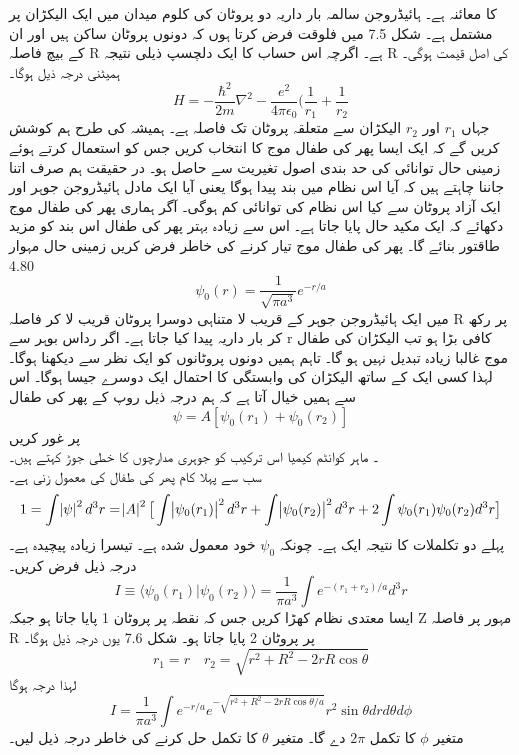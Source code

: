 \documentclass{book}
\begin{document}
 کا معائنہ ہے۔ ہائیڈروجن سالمہ بار داریہ دو پروٹان کی کلوم میدان میں ایک الیکڑان پر مشتمل ہے۔  شکل 7.5 
میں فلوقت فرض کرتا ہوں کہ دونوں پروٹان ساکن ہیں اور ان کے بیچ فاصلہ R  ہے۔ اگرچہ اس حساب کا ایک دلچسپ ذیلی نتیجہ R کی اصل قیمت ہوگی۔  ہمیٹنی درجہ ذیل ہوگا۔
 \[H=-\frac{\hbar^{2}}{2m}\nabla^{2}-\frac{e^{2}}{4\pi\epsilon_{0}}(\frac{1}{r_{1}}+\frac{1}{r_{2}}\]
جہاں
\( r_{1}\)  
اور 
\(r_{2}\) 
الیکڑان سے متعلقہ پروٹان تک فاصلہ ہے۔ ہمیشہ کی طرح ہم کوشش کریں گے کہ ایک ایسا پھر کی طفال موج کا انتخاب کریں جس کو استعمال کرتے ہوئے زمینی حال توانائی کی حد بندی اصول تغیریت سے حاصل ہو۔ در حقیقت ہم صرف اتنا جاننا چاہتے ہیں کہ آیا اس نظام میں  بند پیدا ہوگا یعنی آیا ایک مادل ہائیڈروجن جوہر اور ایک آزاد پروٹان سے کیا اس نظام کی توانائی کم ہوگی۔ آگر ہماری پھر کی طفال موج دکھائے کہ ایک مکید حال پایا جاتا ہے۔ اس سے زیادہ بہتر پھر کی طفال اس بند کو مزید طاقتور بنائے گا۔ پھر کی طفال موج تیار کرنے کی خاطر فرض کریں زمینی حال مہوار 4.80
\[\psi_{0}(r)=\frac{1}{\sqrt{\pi a^{3}}}e^{-r/a}\]
 میں ایک ہائیڈروجن جوہر کے قریب لا متناہی دوسرا پروٹان قریب لا کر فاصلہ  R پر رکھ کر بار داریہ پیدا کیا جاتا ہے۔ اگر رداس بوہر سے r کافی بڑا ہو تب الیکڑان کی طفال موج غالبا زیادہ تبدیل نہیں ہو گا۔ تاہم ہمیں دونوں پروٹانوں کو ایک نظر سے دیکھنا ہوگا۔ لہذا کسی ایک کے ساتھ الیکڑان کی وابستگی کا احتمال ایک دوسرے جیسا ہوگا۔ اس سے ہمیں خیال آتا ہے کہ ہم درجہ ذیل روپ کے پھر کی طفال 
  \[\psi=A[\psi_{0}(r_{1})+\psi_{0}(r_{2})]\]
 پر غور کریں\\
۔ ماہر کوانٹم کیمیا اس ترکیب کو جوہری مدارچوں کا خطی جوڑ کہتے ہیں۔ \\
سب سے پہلا کام پھر کی طفال کی معمول زنی ہے۔
 \[1=\int\abs{\psi}^{2}d^{3}r=\abs{A}^{2}\big [\int \abs{\psi_{0}(r_{1})}^{2}d^{3}r+\int \abs{\psi_{0}(r_{2})}^{2}d^{3}r+2\int\psi_{0}(r_{1})\psi_{0}(r_{2})d^{3}r\big ]\]
پہلے دو تکلملات کا نتیجہ ایک ہے۔ چونکہ  
\(\psi_{0}\)
خود معمول شدہ ہے۔ تیسرا زیادہ پیچیدہ ہے۔ درجہ ذیل فرض کریں۔\\
 \[I\equiv\langle \psi_{0}(r_{1})|\psi_{0}(r_{2})\rangle=\frac{1}{\pi a^{3}}\int e^{-(r_{1}+r_{2})/a}d^{3}r\]
ایسا معتدی نظام کھڑا کریں جس کہ نقطہ پر پروٹان 1 پایا جاتا ہو جبکہ Z مہور پر فاصلہ R پر پروٹان 2 پایا جاتا ہو۔ شکل 7.6 یوں درجہ ذیل ہوگا۔ \\
\[r_{1}=r \quad r_{2}=\sqrt{r^{2}+R^{2}-2rR\cos{\theta}}\]
لہذا درجہ ہوگا \\
\[I=\frac{1}{\pi a^{3}}\int e^{-r/a}e^{-\sqrt{r^{2}+R^{2}-2rR\cos{\theta/a}}}r^{2}\sin{\theta}drd\theta d\phi\]
متغیر 
\(\phi\)
 کا تکمل 
 \(2\pi\)
  دے گا۔ متغیر 
  \(\theta\)
   کا تکمل حل کرنے کی خاطر درجہ ذیل لیں۔\\
\end{document}
